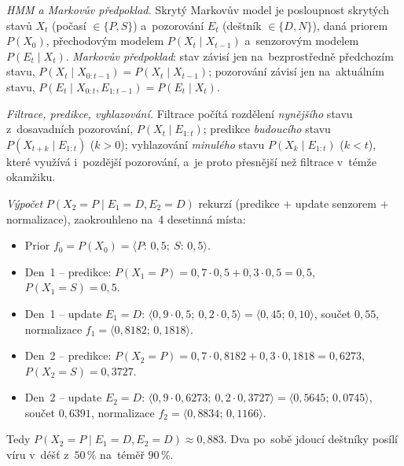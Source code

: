 \noindent\emph{HMM a Markovův předpoklad.} Skrytý Markovův model je posloupnost skrytých stavů $X_t$ (počasí $\in\{P,S\}$) a~pozorování $E_t$ (deštník $\in\{D,N\}$), daná priorem $P(X_0)$, přechodovým modelem $P(X_t\mid X_{t-1})$ a~senzorovým modelem $P(E_t\mid X_t)$. \emph{Markovův předpoklad}: stav závisí jen na~bezprostředně předchozím stavu, $P(X_t\mid X_{0:t-1})=P(X_t\mid X_{t-1})$; pozorování závisí jen na~aktuálním stavu, $P(E_t\mid X_{0:t},E_{1:t-1})=P(E_t\mid X_t)$.

\noindent\emph{Filtrace, predikce, vyhlazování.} Filtrace počítá rozdělení \emph{nynějšího} stavu z~dosavadních pozorování, $P(X_t\mid E_{1:t})$; predikce \emph{budoucího} stavu $P(X_{t+k}\mid E_{1:t})$ ($k>0$); vyhlazování \emph{minulého} stavu $P(X_k\mid E_{1:t})$ ($k<t$), které využívá i~pozdější pozorování, a~je proto přesnější než filtrace v~témže okamžiku.

\noindent\emph{Výpočet} $P(X_2=P\mid E_1=D,E_2=D)$ rekurzí (predikce $+$ update senzorem $+$ normalizace), zaokrouhleno na~4 desetinná místa:
\begin{itemize}[nosep]
  \item Prior $f_0=P(X_0)=\langle P{:}\,0{,}5;\ S{:}\,0{,}5\rangle$.
  \item Den~1 -- predikce: $P(X_1{=}P)=0{,}7\cdot0{,}5+0{,}3\cdot0{,}5=0{,}5$, $P(X_1{=}S)=0{,}5$.
  \item Den~1 -- update $E_1{=}D$: $\langle 0{,}9\cdot0{,}5;\ 0{,}2\cdot0{,}5\rangle=\langle0{,}45;\,0{,}10\rangle$, součet $0{,}55$, normalizace $f_1=\langle 0{,}8182;\,0{,}1818\rangle$.
  \item Den~2 -- predikce: $P(X_2{=}P)=0{,}7\cdot0{,}8182+0{,}3\cdot0{,}1818=0{,}6273$, $P(X_2{=}S)=0{,}3727$.
  \item Den~2 -- update $E_2{=}D$: $\langle 0{,}9\cdot0{,}6273;\ 0{,}2\cdot0{,}3727\rangle=\langle0{,}5645;\,0{,}0745\rangle$, součet $0{,}6391$, normalizace $f_2=\langle 0{,}8834;\,0{,}1166\rangle$.
\end{itemize}
Tedy $P(X_2=P\mid E_1{=}D,E_2{=}D)\approx \boxed{0{,}883}$. Dva po~sobě jdoucí deštníky posílí víru v~déšť z~$50\,\%$ na~téměř $90\,\%$.
